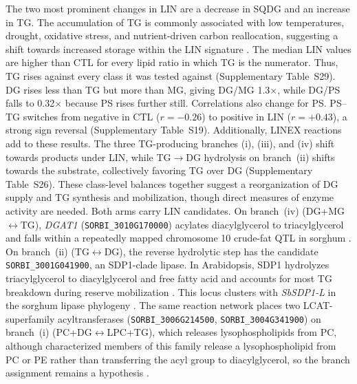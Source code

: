 \documentclass[9pt,twocolumn,twoside]{rilabRxiv}
\begin{document}
The two most prominent changes in LIN are a decrease in SQDG and an increase in TG. The accumulation of TG is commonly associated with low temperatures, drought, oxidative stress, and nutrient-driven carbon reallocation, suggesting a shift towards increased storage within the LIN signature \citep{Tan2018, Yan2025, Pfaff2020}. The median LIN values are higher than CTL for every lipid ratio in which TG is the numerator. Thus, TG rises against every class it was tested against (Supplementary Table~S29). DG rises less than TG but more than MG, giving DG/MG 1.3$\times$, while DG/PS falls to 0.32$\times$ because PS rises further still. Correlations also change for PS. PS--TG switches from negative in CTL ($r=-0.26$) to positive in LIN ($r=+0.43$), a strong sign reversal (Supplementary Table~S19). Additionally, LINEX reactions add to these results. The three TG-producing branches (i), (iii), and (iv) shift towards products under LIN, while TG$\rightarrow$DG hydrolysis on branch~(ii) shifts towards the substrate, collectively favoring TG over DG (Supplementary Table~S26). These class-level balances together suggest a reorganization of DG supply and TG synthesis and mobilization, though direct measures of enzyme activity are needed. Both arms carry LIN candidates. On branch~(iv) (DG+MG$\leftrightarrow$TG), \textit{DGAT1} (\texttt{SORBI\_3010G170000}) acylates diacylglycerol to triacylglycerol and falls within a repeatedly mapped chromosome 10 crude-fat QTL in sorghum \citep{Boyles2017DGAT1, Yen2008DGAT}. On branch~(ii) (TG$\leftrightarrow$DG), the reverse hydrolytic step has the candidate \texttt{SORBI\_3001G041900}, an SDP1-clade lipase. In Arabidopsis, SDP1 hydrolyzes triacylglycerol to diacylglycerol and free fatty acid and accounts for most TG breakdown during reserve mobilization \citep{Kelly2011SDP1L}. This locus clusters with \textit{SbSDP1-L} in the sorghum lipase phylogeny \citep{Sapara2024PLA}. The same reaction network places two LCAT-superfamily acyltransferases (\texttt{SORBI\_3006G214500}, \texttt{SORBI\_3004G341900}) on branch~(i) (PC+DG$\leftrightarrow$LPC+TG), which releases lysophospholipids from PC, although characterized members of this family release a lysophospholipid from PC or PE rather than transferring the acyl group to diacylglycerol, so the branch assignment remains a hypothesis \citep{Chen2012LCATPLA, Banas2005PSAT}.
\end{document}
